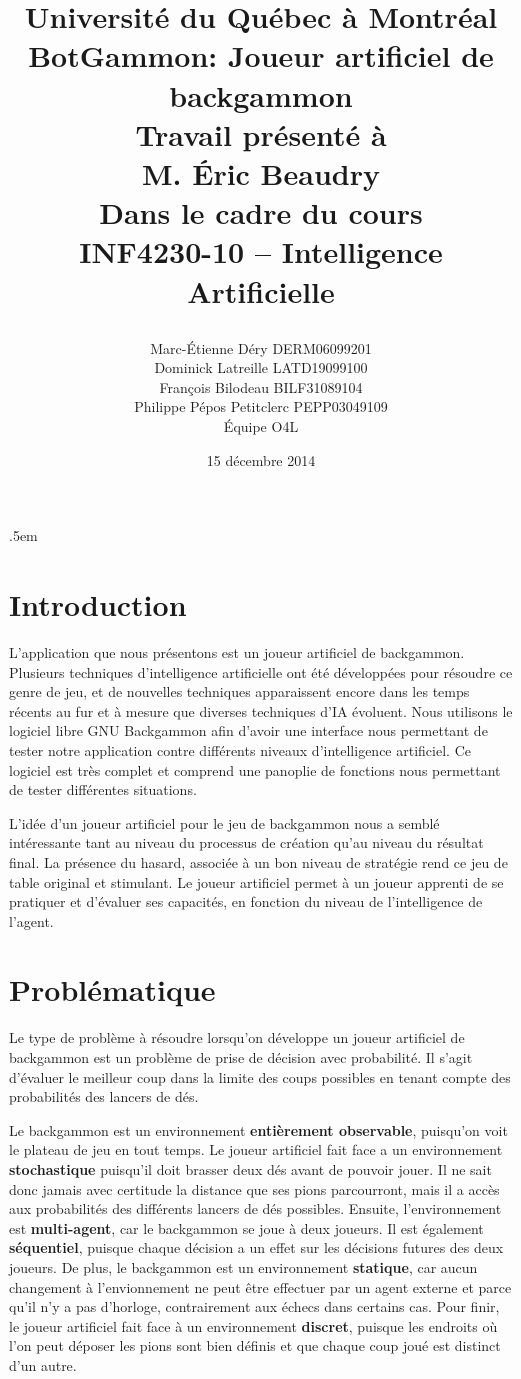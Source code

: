 \documentclass{article}
\title{%
\Large{Université du Québec à Montréal}\\
\vspace{3cm}
\huge{BotGammon: Joueur artificiel de backgammon}\\
\vspace{3cm}
\Large{Travail présenté à \\M. Éric Beaudry} \\
\vspace{1.5cm}
\Large{Dans le cadre du cours \\INF4230-10 – Intelligence Artificielle} \\
\vspace{1cm}
\author{Marc-Étienne Déry DERM06099201\\Dominick Latreille LATD19099100\\François Bilodeau BILF31089104\\Philippe Pépos Petitclerc PEPP03049109\\Équipe O4L}
\date{\vspace{0.5cm} 15 décembre 2014}
\vfill
}
\begin{document}
\maketitle

\thispagestyle{empty}
\clearpage

\openup .5em

\section{Introduction}
L’application que nous présentons est un joueur artificiel de backgammon.
Plusieurs techniques d’intelligence artificielle ont été développées pour
résoudre ce genre de jeu, et de nouvelles techniques apparaissent encore dans
les temps récents au fur et à mesure que diverses techniques d’IA évoluent. Nous
utilisons le logiciel libre GNU Backgammon afin d’avoir une interface nous
permettant de tester notre application contre différents niveaux d’intelligence
artificiel. Ce logiciel est très complet et comprend une panoplie de fonctions
nous permettant de tester différentes situations.

L’idée d’un joueur artificiel pour le jeu de backgammon nous a semblé
intéressante tant au niveau du processus de création qu’au niveau du résultat
final. La présence du hasard, associée à un bon niveau de stratégie rend ce jeu
de table original et stimulant. Le joueur artificiel permet à un joueur apprenti
de se pratiquer et d’évaluer ses capacités, en fonction du niveau de
l’intelligence de l’agent.

\section{Problématique}
Le type de problème à résoudre lorsqu’on développe un joueur artificiel de
backgammon est un problème de prise de décision avec probabilité. Il s’agit
d’évaluer le meilleur coup dans la limite des coups possibles en tenant compte
des probabilités des lancers de dés. 

Le backgammon est un environnement \textbf{entièrement observable}, puisqu’on voit le
plateau de jeu en tout temps. Le joueur artificiel fait face a un environnement
\textbf{stochastique} puisqu’il doit brasser deux dés avant de pouvoir jouer. Il ne sait
donc jamais avec certitude la distance que ses pions parcourront, mais il a
accès aux probabilités des différents lancers de dés possibles. Ensuite,
l’environnement est \textbf{multi-agent}, car le backgammon se joue à deux joueurs. Il
est également \textbf{séquentiel}, puisque chaque décision a un effet sur les décisions
futures des deux joueurs. De plus, le backgammon est un environnement
\textbf{statique},
car aucun changement à l’envionnement ne peut être effectuer par un agent
externe et parce qu’il n’y a pas d’horloge, contrairement aux échecs dans
certains cas. Pour finir, le  joueur artificiel fait face à un environnement
\textbf{discret}, puisque les endroits où l’on peut déposer les pions sont bien définis
et que chaque coup joué est distinct d’un autre.
\end{document}
